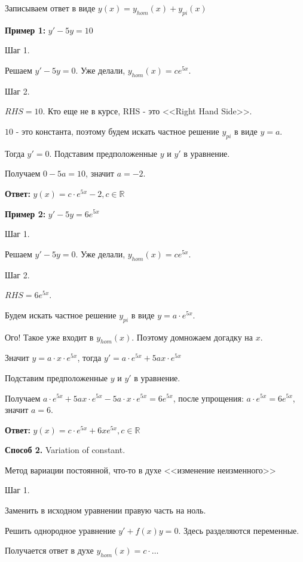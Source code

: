 \documentclass[10pt, a4paper]{article}
\begin{document}
\par Записываем ответ в виде $y(x) = y_{hom}(x) + y_{pi}(x)$
\par \textbf{Пример 1:} $y' - 5y = 10$
\par Шаг 1.
\par Решаем $y' - 5y = 0$. Уже делали, $y_{hom}(x) = ce^{5x}$.
\par Шаг 2.
\par $RHS = 10.$ Кто еще не в курсе, RHS - это <<Right Hand Side>>.
\par $10$ - это константа, поэтому будем искать частное решение $y_{pi}$ в виде $y = a$.
\par Тогда $y' = 0$. Подставим предположенные $y$ и $y'$ в уравнение.
\par Получаем $0 - 5a  = 10$, значит $a = -2.$
\par \textbf{Ответ:} $y(x) = c \cdot e^{5x} - 2, c \in \mathbb{R}$
\par \textbf{Пример 2:} $y' - 5y = 6e^{5x}$
\par Шаг 1.
\par Решаем $y' - 5y = 0$. Уже делали, $y_{hom}(x) = ce^{5x}$.
\par Шаг 2.
\par $RHS = 6e^{5x}.$
\par Будем искать частное решение $y_{pi}$ в виде $y = a \cdot e^{5x}$.
\par Ого! Такое уже входит в $y_{hom}(x)$. Поэтому домножаем догадку на $x$.
\par Значит $y = a \cdot x \cdot e^{5x}$, тогда $y' = a \cdot e^{5x} + 5ax \cdot e^{5x}$
\par Подставим предположенные $y$ и $y'$ в уравнение.
\par Получаем $a \cdot e^{5x} + 5ax \cdot e^{5x} - 5a \cdot x \cdot e^{5x}  = 6e^{5x}$, после упрощения: $a \cdot e^{5x} = 6e^{5x}$, значит $a = 6.$
\par \textbf{Ответ:} $y(x) = c \cdot e^{5x} + 6x e^{5x}, c \in \mathbb{R}$
\par \textbf{Способ 2.} Variation of constant.
\par Метод вариации постоянной, что-то в духе <<изменение неизменного>>
\par Шаг 1.
\par Заменить в исходном уравнении правую часть на ноль.
\par Решить однородное уравнение $y' + f(x) y = 0$. Здесь разделяются переменные.
\par Получается ответ в духе $y_{hom}(x) = c \cdot \dots$
\end{document}
